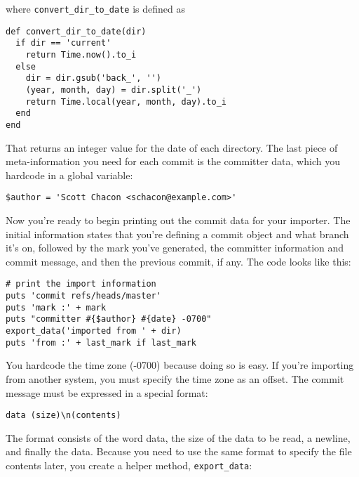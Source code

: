 \documentclass[a4paper]{book}
\begin{document}
where \texttt{convert\_dir\_to\_date} is defined as

\begin{shaded}\begin{verbatim}
def convert_dir_to_date(dir)
  if dir == 'current'
    return Time.now().to_i
  else
    dir = dir.gsub('back_', '')
    (year, month, day) = dir.split('_')
    return Time.local(year, month, day).to_i
  end
end
\end{verbatim}\end{shaded}

That returns an integer value for the date of each directory. The last piece of meta-information you need for each commit is the committer data, which you hardcode in a global variable:

\begin{shaded}\begin{verbatim}
$author = 'Scott Chacon <schacon@example.com>'
\end{verbatim}\end{shaded}

Now you're ready to begin printing out the commit data for your importer. The initial information states that you're defining a commit object and what branch it's on, followed by the mark you've generated, the committer information and commit message, and then the previous commit, if any. The code looks like this:

\begin{shaded}\begin{verbatim}
# print the import information
puts 'commit refs/heads/master'
puts 'mark :' + mark
puts "committer #{$author} #{date} -0700"
export_data('imported from ' + dir)
puts 'from :' + last_mark if last_mark
\end{verbatim}\end{shaded}

You hardcode the time zone (-0700) because doing so is easy. If you're importing from another system, you must specify the time zone as an offset. The commit message must be expressed in a special format:

\begin{shaded}\begin{verbatim}
data (size)\n(contents)
\end{verbatim}\end{shaded}

The format consists of the word data, the size of the data to be read, a newline, and finally the data. Because you need to use the same format to specify the file contents later, you create a helper method, \texttt{export\_data}:
\end{document}
